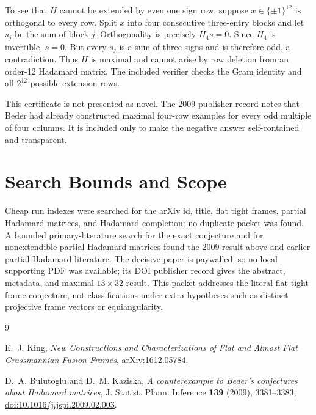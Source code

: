 \documentclass[11pt]{article}
\begin{document}
To see that $H$ cannot be extended by even one sign row, suppose
$x\in\{\pm1\}^{12}$ is orthogonal to every row.  Split $x$ into four
consecutive three-entry blocks and let $s_j$ be the sum of block $j$.
Orthogonality is precisely $H_4s=0$.  Since $H_4$ is invertible, $s=0$.
But every $s_j$ is a sum of three signs and is therefore odd, a contradiction.
Thus $H$ is maximal and cannot arise by row deletion from an order-12 Hadamard
matrix.  The included verifier checks the Gram identity and all $2^{12}$
possible extension rows.

This certificate is not presented as novel.  The 2009 publisher record notes
that Beder had already constructed maximal four-row examples for every odd
multiple of four columns.  It is included only to make the negative answer
self-contained and transparent.

\section*{Search Bounds and Scope}

Cheap run indexes were searched for the arXiv id, title, flat tight frames,
partial Hadamard matrices, and Hadamard completion; no duplicate packet was
found.  A bounded primary-literature search for the exact conjecture and for
nonextendible partial Hadamard matrices found the 2009 result above and earlier
partial-Hadamard literature.  The decisive paper is paywalled, so no local
supporting PDF was available; its DOI publisher record gives the abstract,
metadata, and maximal $13\times32$ result.  This packet addresses the literal
flat-tight-frame conjecture, not classifications under extra hypotheses such
as distinct projective frame vectors or equiangularity.

\begin{thebibliography}{9}

E.~J. King,
\emph{New Constructions and Characterizations of Flat and Almost Flat
Grassmannian Fusion Frames}, arXiv:1612.05784.

D.~A. Bulutoglu and D.~M. Kaziska,
\emph{A counterexample to Beder's conjectures about Hadamard matrices},
J. Statist. Plann. Inference \textbf{139} (2009), 3381--3383,
\href{https://doi.org/10.1016/j.jspi.2009.02.003}{doi:10.1016/j.jspi.2009.02.003}.

\end{thebibliography}
\end{document}
